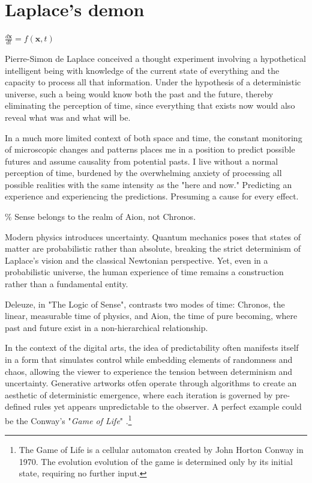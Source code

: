 \chapter*{Laplace's demon}
\begin{center}
\vspace{2cm}
\begin{flushright}
\large
\textit{$\frac{d\mathbf{x}}{dt} = f(\mathbf{x}, t)$ }
\end{flushright}
\vspace{2cm}
\end{center}
\normalsize

\newpage  %
Pierre-Simon de Laplace conceived a thought experiment involving a hypothetical intelligent being with knowledge of the current state of everything and the capacity to process all that information. Under the hypothesis of a deterministic universe, such a being would know both the past and the future, thereby eliminating the perception of time, since everything that exists now would also reveal what was and what will be.

In a much more limited context of both space and time, the constant monitoring of microscopic changes and patterns places me in a position to predict possible futures and assume causality from potential pasts. I live without a normal perception of time, burdened by the overwhelming anxiety of processing all possible realities with the same intensity as the "here and now." Predicting an experience and experiencing the predictions. Presuming a cause for every effect. 

{\scriptsize \textcolor{comment}{\% Sense belongs to the realm of Aion, not Chronos. }}

Modern physics introduces uncertainty. Quantum mechanics poses that states of matter are probabilistic rather than absolute, breaking the strict determinism of Laplace's vision and the classical Newtonian perspective. Yet, even in a probabilistic universe, the human experience of time remains a construction rather than a fundamental entity.

Deleuze, in "The Logic of Sense", contrasts two modes of time: Chronos, the linear, measurable time of physics, and Aion, the time of pure becoming, where past and future exist in a non-hierarchical relationship.\citep{deleuze1969}

In the context of the digital arts, the idea of predictability often manifests itself in a form that simulates control while embedding elements of randomness and chaos, allowing the viewer to experience the tension between determinism and uncertainty. Generative artworks otfen operate through algorithms to create an aesthetic of deterministic emergence, where each iteration is governed by pre-defined rules yet appears unpredictable to the observer. A perfect example could be the Conway's "\textit{Game of Life}" \citep{wiki:gol}.\footnote{The Game of Life is a cellular automaton created by John Horton Conway in 1970. The evolution evolution of the game is determined only by its initial state, requiring no further input.}

